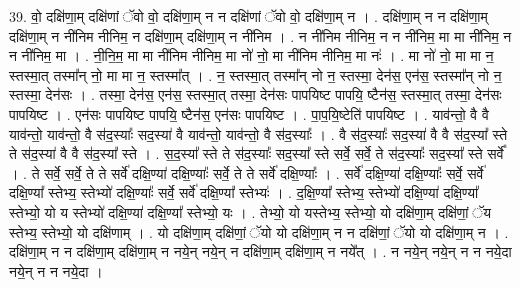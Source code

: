 \documentclass[17pt]{extarticle}
\begin{document}
39. वो॒ दक्षि॑णा॒म् दक्षि॑णां ॅवो वो॒ दक्षि॑णा॒म् न न दक्षि॑णां ॅवो वो॒ दक्षि॑णा॒म् न । . दक्षि॑णा॒म् न न दक्षि॑णा॒म् दक्षि॑णा॒म् न नी॑निम नीनिम॒ न दक्षि॑णा॒म् दक्षि॑णा॒म् न नी॑निम । . न नी॑निम नीनिम॒ न न नी॑निम॒ मा मा नी॑निम॒ न न नी॑निम॒ मा । . नी॒नि॒म॒ मा मा नी॑निम नीनिम॒ मा नो॑ नो॒ मा नी॑निम नीनिम॒ मा नः॑ । . मा नो॑ नो॒ मा मा न॒ स्तस्मा॒त् तस्मा᳚न् नो॒ मा मा न॒ स्तस्मा᳚त् । . न॒ स्तस्मा॒त् तस्मा᳚न् नो न॒ स्तस्मा॒ देन॑स॒ एन॑स॒ स्तस्मा᳚न् नो न॒ स्तस्मा॒ देन॑सः । . तस्मा॒ देन॑स॒ एन॑स॒ स्तस्मा॒त् तस्मा॒ देन॑सः पापयिष्ट पापयि॒ ष्टैन॑स॒ स्तस्मा॒त् तस्मा॒ देन॑सः पापयिष्ट । . एन॑सः पापयिष्ट पापयि॒ ष्टैन॑स॒ एन॑सः पापयिष्ट । . पा॒प॒यि॒ष्टेति॑ पापयिष्ट । . याव॑न्तो॒ वै वै याव॑न्तो॒ याव॑न्तो॒ वै स॑द॒स्याः᳚ सद॒स्या॑ वै याव॑न्तो॒ याव॑न्तो॒ वै स॑द॒स्याः᳚ । . वै स॑द॒स्याः᳚ सद॒स्या॑ वै वै स॑द॒स्या᳚ स्ते ते स॑द॒स्या॑ वै वै स॑द॒स्या᳚ स्ते । . स॒द॒स्या᳚ स्ते ते स॑द॒स्याः᳚ सद॒स्या᳚ स्ते सर्वे॒ सर्वे॒ ते स॑द॒स्याः᳚ सद॒स्या᳚ स्ते सर्वे᳚ । . ते सर्वे॒ सर्वे॒ ते ते सर्वे॑ दक्षि॒ण्या॑ दक्षि॒ण्याः᳚ सर्वे॒ ते ते सर्वे॑ दक्षि॒ण्याः᳚ । . सर्वे॑ दक्षि॒ण्या॑ दक्षि॒ण्याः᳚ सर्वे॒ सर्वे॑ दक्षि॒ण्या᳚ स्तेभ्य॒ स्तेभ्यो॑ दक्षि॒ण्याः᳚ सर्वे॒ सर्वे॑ दक्षि॒ण्या᳚ स्तेभ्यः॑ । . द॒क्षि॒ण्या᳚ स्तेभ्य॒ स्तेभ्यो॑ दक्षि॒ण्या॑ दक्षि॒ण्या᳚ स्तेभ्यो॒ यो य स्तेभ्यो॑ दक्षि॒ण्या॑ दक्षि॒ण्या᳚ स्तेभ्यो॒ यः । . तेभ्यो॒ यो यस्तेभ्य॒ स्तेभ्यो॒ यो दक्षि॑णा॒म् दक्षि॑णां॒ ॅय स्तेभ्य॒ स्तेभ्यो॒ यो दक्षि॑णाम् । . यो दक्षि॑णा॒म् दक्षि॑णां॒ ॅयो यो दक्षि॑णा॒म् न न दक्षि॑णां॒ ॅयो यो दक्षि॑णा॒म् न । . दक्षि॑णा॒म् न न दक्षि॑णा॒म् दक्षि॑णा॒म् न नये॒न् नये॒न् न दक्षि॑णा॒म् दक्षि॑णा॒म् न नये᳚त् । . न नये॒न् नये॒न् न न नये॒दा नये॒न् न न नये॒दा । \newline
\pagebreak
{}
\end{document}
